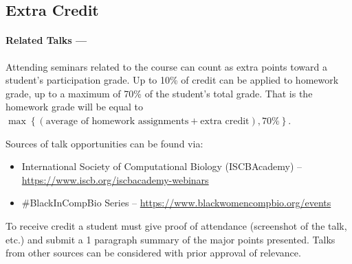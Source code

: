 \documentclass[12pt]{scrartcl}
\begin{document}
\subsection{Extra Credit}
%

\paragraph{Related Talks ---} Attending seminars related to the course can count as extra points toward a student's participation grade. 
Up to 10\% of credit can be applied to homework grade, up to a maximum of 70\% of the student's total grade.
That is the homework grade will be equal to $\displaystyle\max\left\{\left(\textrm{average of homework assignments} + \textrm{extra credit} \right),70\%\right\}$.


Sources of talk opportunities can be found via: 
\begin{itemize}
\item International Society of Computational Biology (ISCBAcademy) -- \\\url{https://www.iscb.org/iscbacademy-webinars}
\item \#BlackInCompBio Series -- \url{https://www.blackwomencompbio.org/events}
\end{itemize}
To receive credit a student must give proof of attendance (screenshot of the talk, etc.) and submit a 1 paragraph summary of the major points presented. 
Talks from other sources can be considered with prior approval of relevance. 
\end{document}
